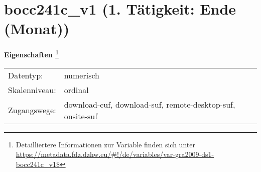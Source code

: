 
    \setcounter{footnote}{0}

    \vspace*{-1.8cm}
	\section{bocc241c\_v1 (1. Tätigkeit: Ende (Monat))}
	\label{section:bocc241c_v1}



    \vspace*{0.5cm}
    \noindent\textbf{Eigenschaften
	\footnote{Detailliertere Informationen zur Variable finden sich unter
		\url{https://metadata.fdz.dzhw.eu/\#!/de/variables/var-gra2009-ds1-bocc241c_v1$}}}\\
	\begin{tabularx}{\hsize}{@{}lX}
	Datentyp: & numerisch \\
	Skalenniveau: & ordinal \\
	Zugangswege: &
	  download-cuf, 
	  download-suf, 
	  remote-desktop-suf, 
	  onsite-suf
 \\
    \end{tabularx}



